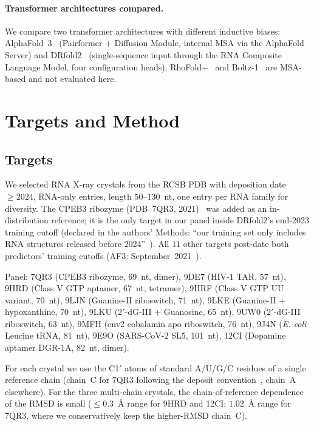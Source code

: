 \documentclass[conference,10pt]{IEEEtran}
\begin{document}
\paragraph{Transformer architectures compared.}
We compare two transformer architectures with different inductive
biases: AlphaFold~3~\cite{af3_2024} (Pairformer + Diffusion Module,
internal MSA via the AlphaFold Server) and
DRfold2~\cite{drfold2_2025} (single-sequence input through the RNA
Composite Language Model, four configuration heads). RhoFold+~\cite{rhofold2024}
and Boltz-1~\cite{boltz_2024} are MSA-based and not evaluated here.

\section{Targets and Method}

\subsection{Targets}

We selected RNA X-ray crystals from the RCSB PDB with deposition
date $\geq 2024$, RNA-only entries, length $50$--$130$~nt, one entry
per RNA family for diversity. The CPEB3 ribozyme
(PDB~7QR3, 2021)~\cite{przytula2022} was added as an
in-distribution reference; it is the only target in our panel inside
DRfold2's end-2023 training cutoff (declared in the
authors' Methods: ``our training set only includes RNA structures
released before 2024''~\cite{drfold2_2025}). All $11$ other targets
post-date both predictors' training cutoffs (AF3:
September~2021~\cite{af3_2024}).

Panel: 7QR3 (CPEB3 ribozyme, 69~nt, dimer),
9DE7 (HIV-1 TAR, 57~nt),
9HRD (Class V GTP aptamer, 67~nt, tetramer),
9HRF (Class V GTP UU variant, 70~nt),
9LJN (Guanine-II riboswitch, 71~nt),
9LKE (Guanine-II + hypoxanthine, 70~nt),
9LKU (2$'$-dG-III + Guanosine, 65~nt),
9UW0 (2$'$-dG-III riboswitch, 63~nt),
9MFH (env2 cobalamin apo riboswitch, 76~nt),
9J4N (\emph{E. coli} Leucine tRNA, 81~nt),
9E9O (SARS-CoV-2 SL5, 101~nt),
12CI (Dopamine aptamer DGR-1A, 82~nt, dimer).

For each crystal we use the C1$'$ atoms of standard A/U/G/C residues
of a single reference chain (chain~C for 7QR3 following the deposit
convention~\cite{przytula2022}, chain~A elsewhere). For the three
multi-chain crystals, the chain-of-reference dependence of the RMSD
is small ($\leq 0.3$~\AA{} range for 9HRD and 12CI; $1.02$~\AA{}
range for 7QR3, where we conservatively keep the higher-RMSD chain~C).
\end{document}
